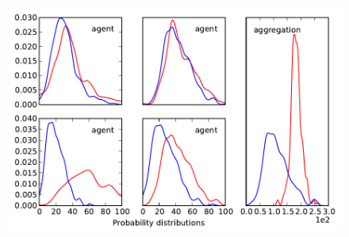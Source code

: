 \documentclass[xcolor=dvipsnames]{beamer}
\begin{document}
\begin{frame}
\begin{columns}
\begin{column}{.5 \linewidth}
\begin{figure}
			\end{figure}
			\begin{figure}
				\includegraphics[scale=.3]{distri.pdf}
			\end{figure}
		\end{column}
	\end{columns}

\end{frame}
\end{document}
